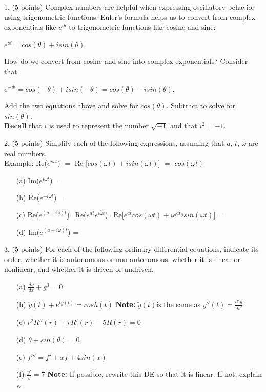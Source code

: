 \documentclass[12pt,letterpaper]{hmcpset}
\begin{document}
\begin{problem}
1. (5 points) Complex numbers are helpful when expressing oscillatory behavior using trigonometric
functions. Euler’s formula helps us to convert from complex exponentials like $e^{i\theta}$ to
trigonometric functions like cosine and sine:
\begin{center}
$e^{i\theta} = cos(\theta) + isin(\theta)$.    
\end{center}
How do we convert from cosine and sine into complex exponentials? Consider that
\begin{center}
$e^{-i\theta} = cos(-\theta) + isin(-\theta)=cos(\theta) - isin(\theta)$.    
\end{center}
Add the two equations above and solve for $cos(\theta)$. Subtract to solve for $sin(\theta)$.\\
\textbf{Recall} that $i$ is used to represent the number $\sqrt{-1}$ and that $i^2 = -1$.
\end{problem}
\newpage

\begin{problem}
2. (5 points) Simplify each of the following expressions, assuming that $a$, $t$, $\omega$ are real numbers.\\
Example:  Re($e^{i\omega t}$) $=$ Re [$cos(\omega t) + isin(\omega t)$] $=$ $cos(\omega t)$

\begin{enumerate}
    \item[(a)] Im($e^{i\omega t}$)= 
    \item[(b)] Re($e^{-i\omega t}$)= 
    \item[(c)] Re($e^{(a+i\omega) t}$)=Re($e^{at}e^{i\omega t}$)=Re[$e^{at}cos(\omega t) + ie^{at}isin(\omega t)$]$=$ 
    \item[(d)] Im($e^{(a+i\omega) t}$) =
\end{enumerate}

\end{problem}
\newpage

\begin{problem}
3. (5 points) For each of the following ordinary differential equations, indicate its order, whether
it is autonomous or non-autonomous, whether it is linear or nonlinear, and whether it is
driven or undriven.\\

\begin{enumerate}
    \item[(a)] $ \frac{dg}{dx}+g^3=0$
    \item[(b)] $\ddot{y}(t)+e^{ty(t)}=cosh(t)$ \textbf{Note:} $\ddot{y}(t)$is the same as $y''(t)= \frac{d^2 y}{dt^2}$ 
    \item[(c)] $r^2R''(r) + rR'(r)-5R(r) =0$
    \item[(d)] $\ddot{\theta}+sin(\theta)=0$
    \item[(e)] $f'''=f'+xf+4sin(x)$
    \item[(f)] $\frac{y'}{y}=7$ \textbf{Note:} If possible, rewrite this DE so that it is linear. If not, explain w
\end{enumerate}

\end{problem}
\newpage
\end{document}
